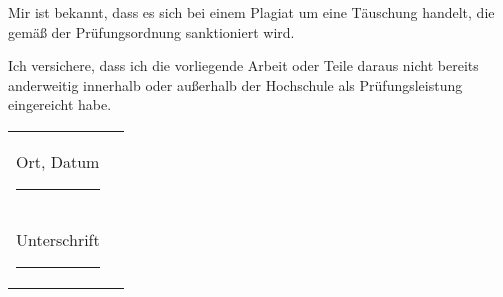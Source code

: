 \vspace{0.7em}

\noindent
Mir ist bekannt, dass es sich bei einem Plagiat um eine Täuschung handelt, die gemäß der Prüfungsordnung sanktioniert wird. \\

\vspace{0.7em}

\noindent
Ich versichere, dass ich die vorliegende Arbeit oder Teile daraus nicht bereits anderweitig innerhalb oder außerhalb der Hochschule als Prüfungsleistung eingereicht habe. \\

\vspace{1.5em}

\noindent
\begin{tabular}{ll}
  Ort, Datum \rule{7cm}{0.4pt} \\[1em]
  Unterschrift \rule{7cm}{0.4pt}
\end{tabular}